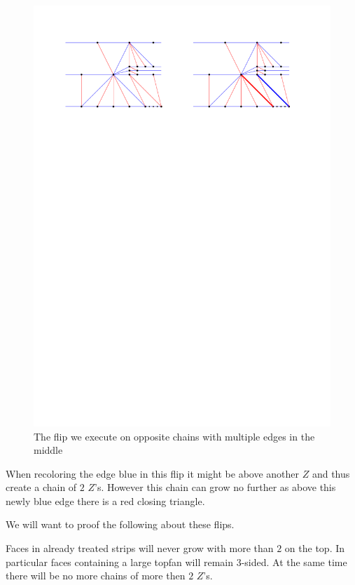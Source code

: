\begin{figure}[h]
  \centering
  \includegraphics[width = \textwidth]{unifiedAlgo/img/post/oppMultiFlip}
  \caption{The flip we execute on opposite chains with multiple edges in the middle}
  \label{fig:uni:oppMultiFlip}
\end{figure}

When recoloring the edge blue in this flip it might be above another $Z$ and thus create a chain of $2$ $Z$'s. However this chain can grow no further as above this newly blue edge there is a red closing triangle.



We will want to proof the following about these flips.

\begin{lemma}
  \label{lm:}
  Faces in already treated strips will never grow with more than $2$ on the top. In particular faces containing a large topfan will remain 3-sided. At the same time there will be no more chains of more then $2$ $Z$'s.
\end{lemma}

